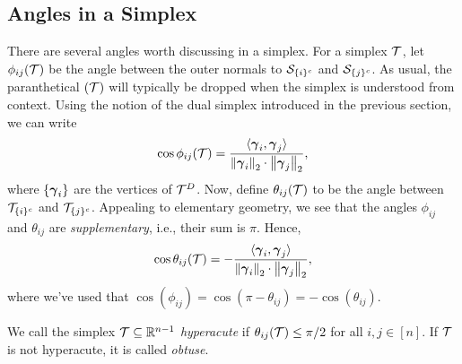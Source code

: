 \subsection{Angles in a Simplex}
\label{sec:background_simplex_angles}
There are several angles worth discussing in a simplex. For a simplex $\mathcal{T}$, let $\phi_{ij}(\mathcal{T})$ be the angle between the outer normals to $\mathcal{S}_{\{i\}^c}$ and $\mathcal{S}_{\{j\}^c}$. As usual, the paranthetical $(\mathcal{T})$ will typically be dropped when the simplex is understood from context. Using the notion of the dual simplex introduced in the previous section, we can write 
 \begin{equation*}
\cos \phi_{ij}(\mathcal{T}) = \frac{\langle \vb*{\gamma}_i,\vb*{\gamma}_j\rangle }{\norm{\vb*{\gamma}_i}_2 \cdot \norm{\vb*{\gamma}_j}_2},
\end{equation*}
where $\{\vb*{\gamma}_i\}$ are the vertices of $\mathcal{T}^D$. 
Now, define $\theta_{ij}(\mathcal{T})$ to be the angle between $\mathcal{T}_{\{i\}^c}$ and $\mathcal{T}_{\{j\}^c}$. Appealing to elementary geometry, we see that the angles $\phi_{ij}$ and $\theta_{ij}$ are \emph{supplementary}, i.e., their sum is $\pi$. Hence, 
\begin{equation}
\label{eq:cos_theta_ij}
\cos \theta_{ij}(\mathcal{T}) = - \frac{\langle \vb*{\gamma}_i,\vb*{\gamma}_j\rangle }{\norm{\vb*{\gamma}_i}_2 \cdot \norm{\vb*{\gamma}_j}_2},
\end{equation}
where we've used that $\cos(\phi_{ij}) = \cos(\pi - \theta_{ij}) = -\cos(\theta_{ij})$. 

\begin{definition}
	\label{def:hyperacute}
	We call the simplex $\mathcal{T}\subseteq \mathbb{R}^{n-1}$ \emph{hyperacute} if $\theta_{ij}(\mathcal{T})\leq \pi/2$ for all $i,j\in[n]$. If $\mathcal{T}$ is not hyperacute, it is called \emph{obtuse}. 
\end{definition}



